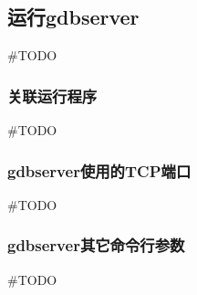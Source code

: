 \subsection{运行gdbserver}

\#TODO

\subsubsection{关联运行程序}
\#TODO

\subsubsection{gdbserver使用的TCP端口}
\#TODO

\subsubsection{gdbserver其它命令行参数}
\#TODO
